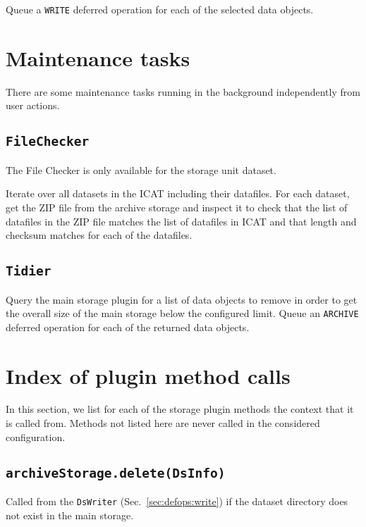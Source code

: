 \documentclass[paper=a4]{scrartcl}
\begin{document}
Queue a \texttt{WRITE} deferred operation for each of the selected
data objects.


\section{Maintenance tasks}
\label{sec:maintenance}

There are some maintenance tasks running in the background
independently from user actions.

\subsection{\texttt{FileChecker}}
\label{sec:maintenance:filechecker}

The File Checker is only available for the storage unit dataset.

Iterate over all datasets in the ICAT including their datafiles.  For
each dataset, get the ZIP file from the archive storage and inspect it
to check that the list of datafiles in the ZIP file matches the list
of datafiles in ICAT and that length and checksum matches for each of
the datafiles.

\subsection{\texttt{Tidier}}
\label{sec:maintenance:tidier}

Query the main storage plugin for a list of data objects to remove in
order to get the overall size of the main storage below the configured
limit.  Queue an \texttt{ARCHIVE} deferred operation for each of the
returned data objects.


\section{Index of plugin method calls}
\label{sec:plugincalls}

In this section, we list for each of the storage plugin methods the
context that it is called from.  Methods not listed here are never
called in the considered configuration.

\subsection{\texttt{archiveStorage.delete(DsInfo)}}

Called from the \texttt{DsWriter} (Sec.~\ref{sec:defops:write}) if
the dataset directory does not exist in the main storage.
\end{document}
